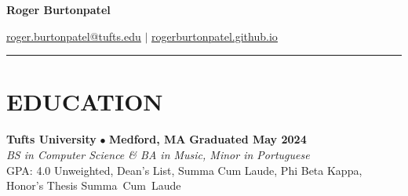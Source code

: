 \documentclass[12pt]{article}
\begin{document}
\begin{center}
    \Huge{\textbf{Roger Burtonpatel}}
\end{center}

\vspace{-1.25\baselineskip} %

\begin{center}
    \href{mailto:roger.burtonpatel@tufts.edu}{\uline{roger.burtonpatel@tufts.edu}} $\vert$
    \href{https://rogerburtonpatel.github.io}{\uline{rogerburtonpatel.github.io}} %
    
    \vspace{-0.3\baselineskip} %

    \rule{16cm}{0.4pt} %
\end{center}

\vspace{-\baselineskip} %

\section*{EDUCATION}
\textbf{Tufts University} $\bullet$  \textbf{Medford, MA} \hfill \textbf{Graduated May 2024} \\
\textit{BS in Computer Science \& BA in Music, Minor in Portuguese} \\ 
GPA: 4.0 Unweighted, Dean's List, Summa Cum Laude, Phi Beta Kappa, \\ 
Honor's Thesis Summa~Cum~Laude

\vspace{-1\baselineskip}
\end{document}
